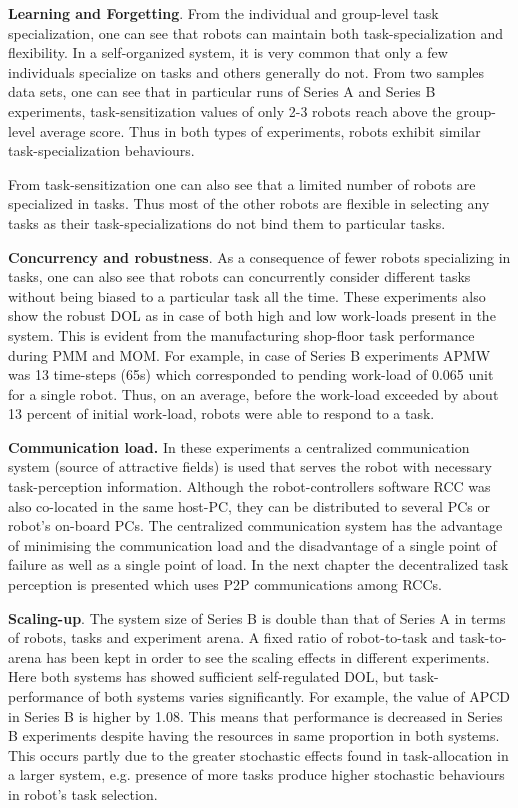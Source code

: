 \textbf{Learning and Forgetting}. From the individual and group-level task specialization, one can see that robots can maintain both task-specialization and flexibility. In a self-organized system, it is very common that only a few individuals specialize on tasks and others generally do not. From two samples data sets, one can see that in particular runs of Series A and Series B experiments, task-sensitization values of  only 2-3 robots reach above the group-level average score. Thus in both types of experiments, robots exhibit similar task-specialization behaviours. 

From task-sensitization one can also see that a limited number of robots are specialized in tasks. Thus most of the other robots are flexible in selecting any tasks as their task-specializations do not bind them to particular tasks.

\textbf{Concurrency and robustness}. As a consequence of fewer robots specializing in tasks, one can also see that robots can concurrently  consider different tasks without being biased to a particular task all the time. These experiments also show the robust DOL as in case of  both high and low work-loads present in the system. This is evident from the manufacturing shop-floor task performance during PMM and MOM. For example,  in case of Series B experiments APMW was 13 time-steps (65s) which corresponded  to pending work-load of 0.065 unit for a single robot. Thus, on an average, before the work-load exceeded by about 13 percent of initial work-load, robots were able to respond to  a task.

\textbf{Communication load.} In these experiments  a centralized communication system (source of attractive fields) is used that serves the robot with necessary task-perception information. Although the robot-controllers software RCC was also co-located in the same host-PC, they can be distributed to several PCs or robot's on-board PCs. The centralized communication system has the advantage of minimising the communication load and the disadvantage of a single point of failure as well as a single point of load. In the next chapter the decentralized task perception is presented which uses P2P communications among RCCs.

\textbf{Scaling-up}. The system size of Series B is double than that of Series A in terms of robots, tasks and experiment arena.  A fixed ratio of robot-to-task and task-to-arena has been kept in order to see the scaling effects in different experiments. Here both systems has showed sufficient self-regulated DOL, but task-performance of both systems varies significantly. For example, the value of APCD in Series B is higher by 1.08. This means that performance  is decreased in Series B experiments despite having the resources in same proportion in both systems. This occurs partly due to the greater stochastic effects found in task-allocation in a larger system, e.g. presence of more tasks produce higher stochastic behaviours in robot's task selection.

